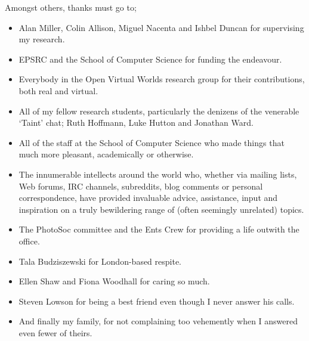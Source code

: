 Amongst others, thanks must go to;

\begin{itemize}

	\item Alan Miller, Colin Allison, Miguel Nacenta and Ishbel Duncan for supervising my research.
	
	\item EPSRC and the School of Computer Science for funding the endeavour.
	
	\item Everybody in the Open Virtual Worlds research group for their contributions, both real and virtual.
	
	\item All of my fellow research students, particularly the denizens of the venerable `Taint' chat; Ruth Hoffmann, Luke Hutton and Jonathan Ward.
	
	\item All of the staff at the School of Computer Science who made things that much more pleasant, academically or otherwise.
	
	\item The innumerable intellects around the world who, whether via mailing lists, Web forums, IRC channels, subreddits, blog comments or personal correspondence, have provided invaluable advice, assistance, input and inspiration on a truly bewildering range of (often seemingly unrelated) topics.
	
	\item The PhotoSoc committee and the Ents Crew for providing a life outwith the office.
	
	\item Tala Budziszewski for London-based respite.
	
	\item Ellen Shaw and Fiona Woodhall for caring so much.
	
	\item Steven Lowson for being a best friend even though I never answer his calls.
	
	\item And finally my family, for not complaining too vehemently when I answered even fewer of theirs.

\end{itemize}